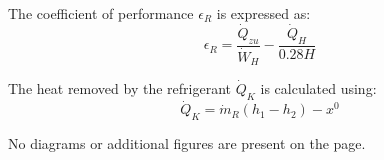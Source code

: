The coefficient of performance \( \epsilon_R \) is expressed as:  
\[
\epsilon_R = \frac{\dot{Q}_{zu}}{\dot{W}_H} - \frac{\dot{Q}_H}{0.28H}
\]

The heat removed by the refrigerant \( \dot{Q}_K \) is calculated using:  
\[
\dot{Q}_K = \dot{m}_R (h_1 - h_2) - x^0
\]  

No diagrams or additional figures are present on the page.